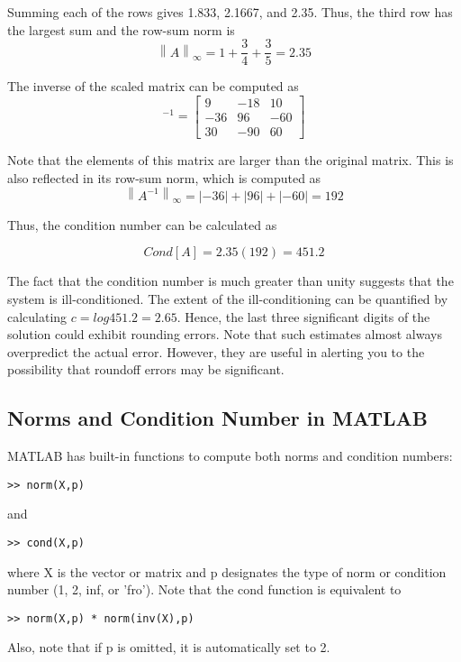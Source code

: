 \documentclass[../main.tex]{subfiles}
\begin{document}
Summing each of the rows gives 1.833, 2.1667, and 2.35. Thus, the third row has the largest sum and the row-sum norm is
\begin{equation}
\left \| A \right \|_{\infty}=1+\frac{3}{4}+\frac{3}{5}=2.35
\end{equation}

The inverse of the scaled matrix can be computed as
\begin{equation}
[A]^{-1}=
\begin{bmatrix}
9& -18& 10\\
-36& 96& -60\\
30& -90& 60
\end{bmatrix}
\end{equation}

Note that the elements of this matrix are larger than the original matrix. This is also reflected in its row-sum norm, which is computed as
\begin{equation}
\left \| A^{-1} \right \|_{\infty}=\left | -36 \right |+
\left | 96 \right |+ \left | -60 \right |=192
\end{equation}

Thus, the condition number can be calculated as

$$Cond[A] = 2.35(192) = 451.2$$

The fact that the condition number is much greater than unity suggests that the system is ill-conditioned. The extent of the ill-conditioning can be quantified by calculating
$c = log 451.2 = 2.65$. Hence, the last three significant digits of the solution could exhibit
rounding errors. Note that such estimates almost always overpredict the actual error. However,
they are useful in alerting you to the possibility that roundoff errors may be significant.

\subsection{Norms and Condition Number in MATLAB}

MATLAB has built-in functions to compute both norms and condition numbers:
\begin{lstlisting}[numbers=none]
>> norm(X,p)
\end{lstlisting}
and
\begin{lstlisting}[numbers=none]
>> cond(X,p)
\end{lstlisting}
where X is the vector or matrix and p designates the type of norm or condition number (1, 2, inf, or 'fro'). Note that the cond function is equivalent to
\begin{lstlisting}[numbers=none]
>> norm(X,p) * norm(inv(X),p)
\end{lstlisting}
Also, note that if p is omitted, it is automatically set to 2.
\end{document}
